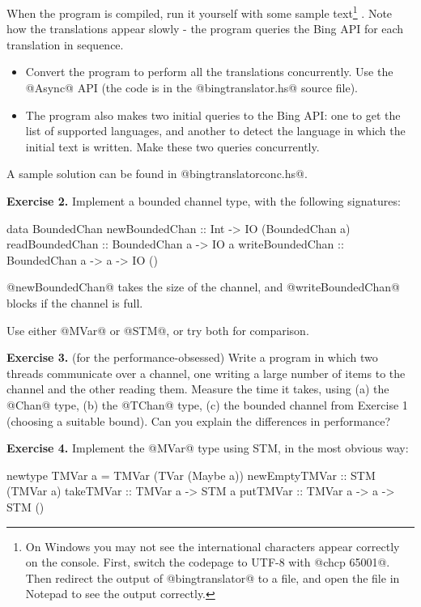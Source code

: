 \documentclass[11pt,a4paper]{article}
\begin{document}
When the program is compiled, run it yourself with some sample
text\footnote{On Windows you may not see the international characters
  appear correctly on the console.  First, switch the codepage to
  UTF-8 with @chcp 65001@.  Then redirect the output of
  @bingtranslator@ to a file, and open the file in Notepad to see the
  output correctly.} . Note how the translations appear slowly - the program queries the Bing API
for each translation in sequence.

\begin{itemize}
\item Convert the program to perform all the translations
  concurrently.  Use the @Async@ API (the code is in the
  @bingtranslator.hs@ source file).
\item The program also makes two initial queries to the Bing API: one
  to get the list of supported languages, and another to detect the
  language in which the initial text is written.  Make these two
  queries concurrently.
\end{itemize}

A sample solution can be found in @bingtranslatorconc.hs@.

\textbf{Exercise 2.} Implement a bounded channel type, with the
following signatures:

\begin{haskell}
data BoundedChan
newBoundedChan  :: Int -> IO (BoundedChan a)
readBoundedChan :: BoundedChan a -> IO a
writeBoundedChan :: BoundedChan a -> a -> IO ()
\end{haskell}

\noindent @newBoundedChan@ takes the size of the channel, and
@writeBoundedChan@ blocks if the channel is full.

Use either @MVar@ or @STM@, or try both for comparison.

\textbf{Exercise 3.} (for the performance-obsessed) Write a program in which
two threads communicate over a channel, one writing a large number of
items to the channel and the other reading them.  Measure the time it
takes, using (a) the @Chan@ type, (b) the @TChan@ type, (c) the
bounded channel from Exercise 1 (choosing a suitable bound).  Can you
explain the differences in performance?

\textbf{Exercise 4.} Implement the @MVar@ type using STM, in the most
obvious way:

\begin{haskell}
newtype TMVar a = TMVar (TVar (Maybe a))
newEmptyTMVar :: STM (TMVar a)
takeTMVar     :: TMVar a -> STM a
putTMVar      :: TMVar a -> a -> STM ()
\end{haskell}
\end{document}
